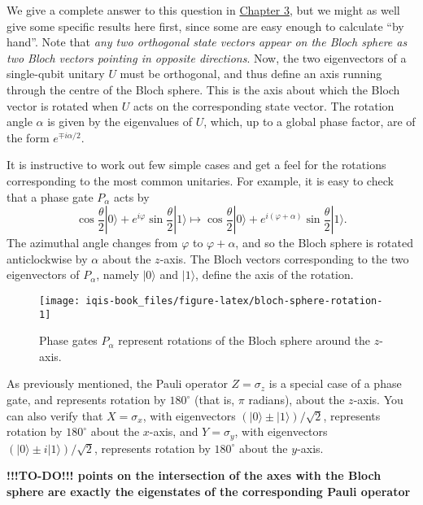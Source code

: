 \documentclass[fleqn]{article}
\begin{document}
We give a complete answer to this question in \protect\hyperlink{chapter3}{Chapter 3}, but we might as well give some specific results here first, since some are easy enough to calculate ``by hand''.
Note that \emph{any two orthogonal state vectors appear on the Bloch sphere as two Bloch vectors pointing in opposite directions}.
Now, the two eigenvectors of a single-qubit unitary \(U\) must be orthogonal, and thus define an axis running through the centre of the Bloch sphere.
This is the axis about which the Bloch vector is rotated when \(U\) acts on the corresponding state vector.
The rotation angle \(\alpha\) is given by the eigenvalues of \(U\), which, up to a global phase factor, are of the form \(e^{\mp i\alpha/2}\).

It is instructive to work out few simple cases and get a feel for the rotations corresponding to the most common unitaries.
For example, it is easy to check that a phase gate \(P_\alpha\) acts by
\[
  \cos\frac{\theta}{2}|0\rangle + e^{i\varphi}\sin\frac{\theta}{2}|1\rangle
  \longmapsto
  \cos\frac{\theta}{2}|0\rangle + e^{i(\varphi+\alpha)}\sin\frac{\theta}{2}|1\rangle.
\]
The azimuthal angle changes from \(\varphi\) to \(\varphi+\alpha\), and so the Bloch sphere is rotated anticlockwise by \(\alpha\) about the \(z\)-axis.
The Bloch vectors corresponding to the two eigenvectors of \(P_\alpha\), namely \(|0\rangle\) and \(|1\rangle\), define the axis of the rotation.



\begin{figure}[H]

{\centering \texttt{[image: iqis-book\_files/figure-latex/bloch-sphere-rotation-1]} 

}

\caption{Phase gates \(P_\alpha\) represent rotations of the Bloch sphere around the \(z\)-axis.}\label{fig:bloch-sphere-rotation}
\end{figure}

As previously mentioned, the Pauli operator \(Z=\sigma_z\) is a special case of a phase gate, and represents rotation by \({180}^{\circ}\) (that is, \(\pi\) radians), about the \(z\)-axis.
You can also verify that \(X=\sigma_x\), with eigenvectors \({(|0\rangle\pm|1\rangle)/\sqrt{2}}\), represents rotation by \({180}^{\circ}\) about the \(x\)-axis, and \(Y=\sigma_y\), with eigenvectors \({(|0\rangle\pm i|1\rangle)/\sqrt{2}}\), represents rotation by \({180}^{\circ}\) about the \(y\)-axis.

\textbf{!!!TO-DO!!! points on the intersection of the axes with the Bloch sphere are exactly the eigenstates of the corresponding Pauli operator}
\end{document}
